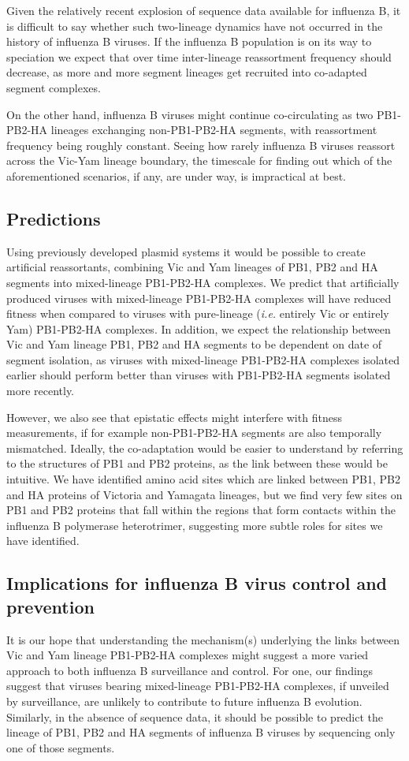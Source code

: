 \documentclass[11pt,oneside,letterpaper]{article}
\begin{document}
Given the relatively recent explosion of sequence data available for influenza B, it is difficult to say whether such two-lineage dynamics have not occurred in the history of influenza B viruses.
If the influenza B population is on its way to speciation we expect that over time inter-lineage reassortment frequency should decrease, as more and more segment lineages get recruited into co-adapted segment complexes.

On the other hand, influenza B viruses might continue co-circulating as two PB1-PB2-HA lineages exchanging non-PB1-PB2-HA segments, with reassortment frequency being roughly constant.
Seeing how rarely influenza B viruses reassort across the Vic-Yam lineage boundary, the timescale for finding out which of the aforementioned scenarios, if any, are under way, is impractical at best.

\subsection*{Predictions}
Using previously developed plasmid systems \cite{hoffmann2002} it would be possible to create artificial reassortants, combining Vic and Yam lineages of PB1, PB2 and HA segments into mixed-lineage PB1-PB2-HA complexes.
We predict that artificially produced viruses with mixed-lineage PB1-PB2-HA complexes will have reduced fitness when compared to viruses with pure-lineage (\textit{i.e.} entirely Vic or entirely Yam) PB1-PB2-HA complexes.
In addition, we expect the relationship between Vic and Yam lineage PB1, PB2 and HA segments to be dependent on date of segment isolation, as viruses with mixed-lineage PB1-PB2-HA complexes isolated earlier should perform better than viruses with PB1-PB2-HA segments isolated more recently.

However, we also see that epistatic effects might interfere with fitness measurements, if for example non-PB1-PB2-HA segments are also temporally mismatched.
Ideally, the co-adaptation would be easier to understand by referring to the structures of PB1 and PB2 proteins, as the link between these would be intuitive.
We have identified amino acid sites which are linked between PB1, PB2 and HA proteins of Victoria and Yamagata lineages, but we find very few sites on PB1 and PB2 proteins that fall within the regions that form contacts within the influenza B polymerase heterotrimer, suggesting more subtle roles for sites we have identified.

\subsection*{Implications for influenza B virus control and prevention}
It is our hope that understanding the mechanism(s) underlying the links between Vic and Yam lineage PB1-PB2-HA complexes might suggest a more varied approach to both influenza B surveillance and control.
For one, our findings suggest that viruses bearing mixed-lineage PB1-PB2-HA complexes, if unveiled by surveillance, are unlikely to contribute to future influenza B evolution.
Similarly, in the absence of sequence data, it should be possible to predict the lineage of PB1, PB2 and HA segments of influenza B viruses by sequencing only one of those segments.
\end{document}
